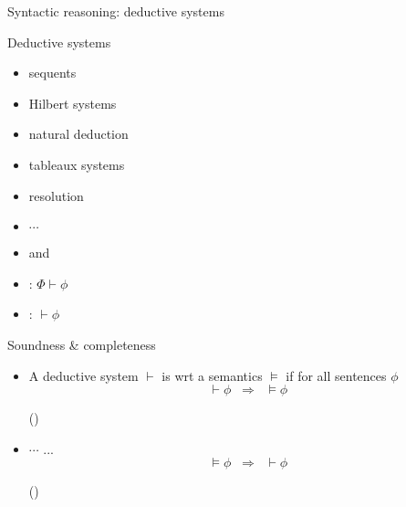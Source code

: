 \documentclass{beamer}
\begin{document}
\begin{slide}{Syntactic reasoning: deductive systems}\label{s:3}
\small

\begin{block}{Deductive systems}
\begin{itemize}
\item sequents
\item Hilbert systems
\item natural deduction
\item tableaux systems
\item resolution
\item $\cdots$
\end{itemize}
\end{block}


\begin{flushright}
\begin{itemize}
\item {} and 
\item {}: $\Phi \vdash \phi$
\item {}: $\vdash \phi$
\end{itemize}
\end{flushright}

\end{slide}

\begin{slide}{Soundness \& completeness}\label{s:4}
\small

\begin{itemize}
\item A deductive system $\vdash$ is  wrt a semantics $\models$ if for all sentences $\phi$
$$ \vdash \phi\; \; \Longrightarrow\; \; \models \phi$$
\begin{flushright}
()
\end{flushright}
\item $\cdots$  ...
$$ \models \phi\; \;  \Longrightarrow\; \;  \vdash \phi$$
\begin{flushright}
()
\end{flushright}
 \end{itemize}

\end{slide}
\end{document}
